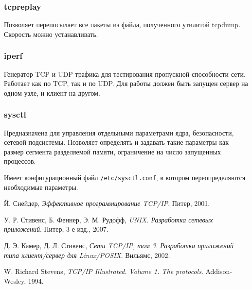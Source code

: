 \subsubsection{tcpreplay}
Позволяет перепосылает все пакеты из файла, полученного утилитой tcpdump. Скорость можно устанавливать.

\subsubsection{iperf}
Генератор TCP и UDP трафика для тестирования пропускной способности сети. Работает как по TCP, так и по UDP. Для работы должен быть запущен сервер на одном узле, и клиент на другом.

\subsubsection{sysctl}
Предназначена для управления отдельными параметрами ядра, безопасности, сетевой подсистемы. Позволяет определять и задавать такие параметры как размер сегмента разделяемой памяти, ограничение на число запущенных процессов.

Имеет конфигурационный файл \texttt{/etc/sysctl.conf}, в котором переопределяются необходимые параметры.

\begin{thebibliography}{9}

  Й. Снейдер,
  \emph{Эффективное программирование TCP/IP}.
  Питер,
  2001.

  У. Р. Стивенс, Б. Феннер, Э. М. Рудофф,
  \emph{UNIX. Разработка сетевых приложений}.
  Питер,
  3-е изд.,
  2007.

  Д. Э. Камер, Д. Л. Стивенс,
  \emph{Сети TCP/IP, том 3. Разработка приложений типа клиент/сервер для Linux/POSIX}.
  Вильямс,
  2002.

  W. Richard Stevens,
  \emph{TCP/IP Illustrated. Volume 1. The protocols}.
  Addison-Wesley,
  1994.

\end{thebibliography}

